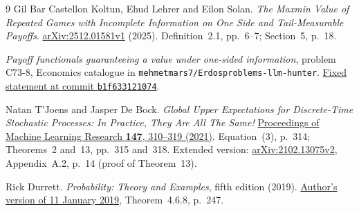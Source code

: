 \documentclass[11pt,a4paper]{article}
\theoremstyle{definition}
\theoremstyle{remark}
\begin{document}
\clearpage
\begin{thebibliography}{9}
Gil Bar Castellon Koltun, Ehud Lehrer and Eilon Solan.
\emph{The Maxmin Value of Repeated Games with Incomplete Information
on One Side and Tail-Measurable Payoffs}.
\href{https://arxiv.org/pdf/2512.01581v1}{arXiv:2512.01581v1} (2025).
Definition~2.1, pp.~6--7; Section~5, p.~18.

\emph{Payoff functionals guaranteeing a value under one-sided
information}, problem C73-8, Economics catalogue in
\texttt{mehmetmars7/Erdosproblems-llm-hunter}.
\href{https://github.com/mehmetmars7/Erdosproblems-llm-hunter/blob/b1f633121074e16579fa7fd05314e5f504d29bae/attacks/open_problems/economics/statements/C73-8.tex}{Fixed statement at commit \texttt{b1f633121074}}.

Natan T'Joens and Jasper De Bock.
\emph{Global Upper Expectations for Discrete-Time Stochastic
Processes: In Practice, They Are All The Same!}
\href{https://proceedings.mlr.press/v147/t-joens21a/t-joens21a.pdf}{Proceedings of Machine Learning Research \textbf{147}, 310--319 (2021)}.
Equation~(3), p.~314; Theorems~2 and~13, pp.~315 and~318.
Extended version:
\href{https://arxiv.org/pdf/2102.13075v2}{arXiv:2102.13075v2},
Appendix~A.2, p.~14 (proof of Theorem~13).

Rick Durrett. \emph{Probability: Theory and Examples}, fifth edition
(2019). \href{https://sites.math.duke.edu/~rtd/PTE/PTE5_011119.pdf}{Author's version of 11 January 2019},
Theorem~4.6.8, p.~247.
\end{thebibliography}
\end{document}
